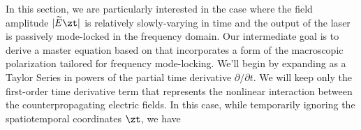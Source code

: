 In this section, we are particularly interested in the case where the field amplitude $|\widetilde{E}\zt|$ is relatively slowly-varying in time and the output of the laser is passively mode-locked in the frequency domain. Our intermediate goal is to derive a master equation based on  that incorporates a form of the macroscopic polarization tailored for frequency mode-locking. We'll begin by expanding  as a Taylor Series in powers of the partial time derivative $\partial / \partial t$. We will keep only the first-order time derivative term that represents the nonlinear interaction between the counterpropagating electric fields. In this case, while temporarily ignoring the spatiotemporal coordinates $\zt$, we have
